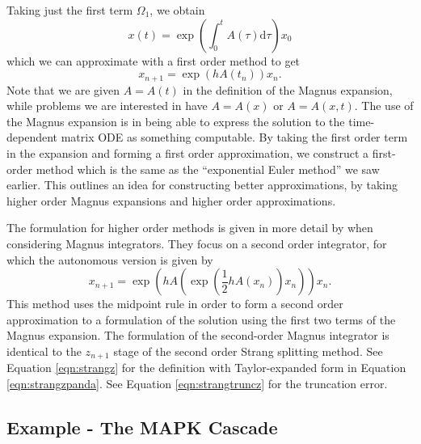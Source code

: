 Taking just the first term $\Omega_1$, we obtain
\begin{equation*}
    x(t) = \exp\left( \int_{0}^{t} A(\tau) \mathrm{d}\tau \right)x_0
\end{equation*}
which we can approximate with a first order method to get
\begin{equation*}
    x_{n+1} = \exp\left( h A(t_n) \right)x_n.
\end{equation*}
Note that we are given $A = A(t)$ in the definition of the Magnus expansion,
while problems we are interested in have $A=A(x)$ or $A=A(x,t)$.
The use of the Magnus expansion is in being able to express the solution to the time-dependent matrix ODE as something computable.
By taking the first order term in the expansion and forming a first order approximation, we construct a first-order method which is the same as the ``exponential Euler method''  we saw earlier.
This outlines an idea for constructing better approximations, by taking higher order Magnus expansions and higher order approximations.

The formulation for higher order methods is given in more detail by \cite{blanes_pos_2022} when considering Magnus integrators.
They focus on a second order integrator, for which the autonomous version is given by
\begin{equation}
    x_{n+1} = \exp\left(h A \left( \exp\left(\frac{1}{2}h A(x_n)\right) x_n \right) \right) x_n.
    \label{eqn:secondordermagnus}
\end{equation}
This method uses the midpoint rule in order to form a second order approximation to a formulation of the solution using the first two terms of the Magnus expansion. 
The formulation of the second-order Magnus integrator is identical to the $z_{n+1}$ stage of the second order Strang splitting method.
See Equation \ref{eqn:strangz} for the definition with Taylor-expanded form in Equation \ref{eqn:strangzpanda}.
See Equation \ref{eqn:strangtruncz} for the truncation error.

\subsection{Example - The MAPK Cascade}

